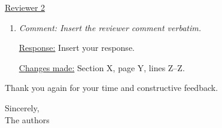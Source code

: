 \documentclass[12pt]{article}
\begin{document}
\newpage
\underline{Reviewer 2}
\begin{enumerate}
\item \emph{Comment: Insert the reviewer comment verbatim.}

\underline{Response:} Insert your response.

\underline{Changes made:} Section X, page Y, lines Z--Z.
\end{enumerate}

\vspace{0.2in}
Thank you again for your time and constructive feedback.

Sincerely,\\
The authors
\end{document}
